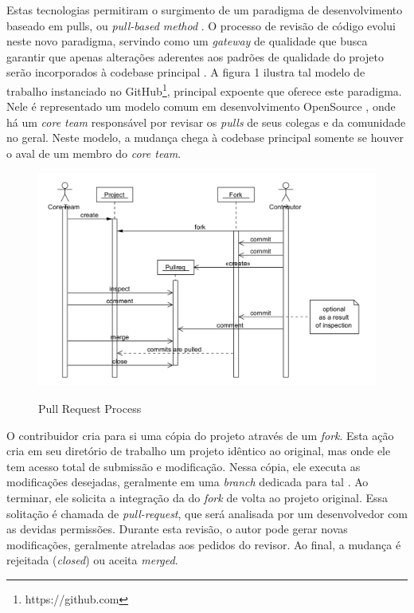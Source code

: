 \documentclass[preprint,12pt]{elsarticle}
\begin{document}
    Estas tecnologias permitiram o surgimento de um paradigma de desenvolvimento baseado em pulls, ou \textit{pull-based method} \cite{gousios2014}. O processo de revisão de código evolui neste novo paradigma, servindo como um \textit{gateway} de qualidade que busca garantir que apenas alterações aderentes aos padrões de qualidade do projeto serão incorporados à codebase principal \cite{gousios2015}. A figura 1 ilustra tal modelo de trabalho instanciado no GitHub\footnote{https://github.com}, principal expoente que oferece este paradigma. Nele é representado um modelo comum em desenvolvimento OpenSource \cite{6385140}, onde há um \textit{core team} responsável por revisar os \textit{pulls} de seus colegas e da comunidade no geral. Neste modelo, a mudança chega à codebase principal somente se houver o aval de um membro do \textit{core team}.

     \begin{figure}[!htbp]
      \includegraphics[width=\textwidth]{pull-request-flow}\label{fig:pull-request-flow}
      \caption{Pull Request Process \cite{gousios2014}}
    \end{figure}

    O contribuidor cria para si uma cópia do projeto através de um \textit{fork}. Esta ação cria em seu diretório de trabalho um projeto idêntico ao original, mas onde ele tem acesso total de submissão e modificação. Nessa cópia, ele executa as modificações desejadas, geralmente em uma \textit{branch} dedicada para tal \cite{gousios2016}. Ao terminar, ele solicita a integração da  do \textit{fork} de volta ao projeto original. Essa solitação é chamada de \textit{pull-request}, que será analisada por um desenvolvedor com as devidas permissões. Durante esta revisão, o autor pode gerar novas modificações, geralmente atreladas aos pedidos do revisor. Ao final, a mudança é rejeitada (\textit{closed}) ou aceita \textit{merged}.
\end{document}

